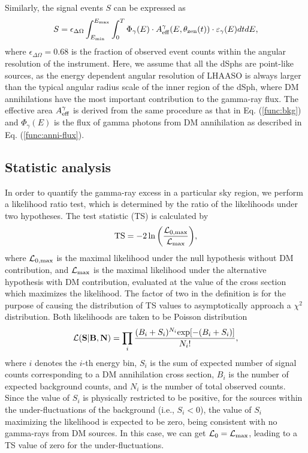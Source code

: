 \documentclass[12pt,aps,prd,amsmath,amssymb,showpacs,floats,floatfix,nofootinbib]{revtex4-1}
\begin{document}
Similarly, the signal events $S$ can be expressed as
\begin{equation}\label{func:sig}
  S=\epsilon_{\Delta\Omega}\int^{E_{\rm max}}_{E_{\rm min}}\int_0^T\Phi_{\gamma}(E)\cdot A_{\rm eff}^{\gamma}(E,\theta_{\rm zen}(t))\cdot\varepsilon_{\gamma}(E)dtdE,
\end{equation}
where $\epsilon_{\Delta\Omega}=0.68$ is the fraction of observed event counts within the angular resolution of the instrument.
Here, we assume that all the dSphs are point-like sources, as the energy dependent angular resolution of LHAASO is always larger than the typical angular radius scale of the inner region of the dSph, where DM annihilations have the most important contribution to the gamma-ray flux.
The effective area $A_{\rm eff}^{\gamma}$ is derived from the same procedure as that in Eq. (\ref{func:bkg}) and $\Phi_{\gamma}(E)$ is the flux of gamma photons from DM annihilation as described in Eq. (\ref{func:anni-flux}).

\subsection{Statistic analysis}\label{sec:analysis}
In order to quantify the gamma-ray excess in a particular sky region, we perform a likelihood ratio test, which is determined by the ratio of the likelihoods under two hypotheses. The test statistic (TS) is calculated by
\begin{equation}\label{func:ts}
  \rm TS=-2\ln\bigg(\frac{\mathcal{L}_{0,{\rm max}}}{\mathcal{L}_{\rm max}}\bigg),
\end{equation}
where $\mathcal{L}_{0,{\rm max}}$ is the maximal likelihood under the null hypothesis without DM contribution, and $\mathcal{L}_{\rm max}$ is the maximal likelihood under the alternative hypothesis with DM contribution, evaluated at the value of the cross section which maximizes the likelihood. The factor of two in the definition is for the purpose of causing the distribution of TS values to asymptotically approach a $\chi^{2}$ distribution. Both likelihoods are taken to be Poisson distribution
\begin{equation}\label{func:likelihood-l}
  \mathcal{L}(\textbf{S}|\textbf{B},\textbf{N})=\prod_{i}\frac{(B_{i}+S_{i})^{N_{i}} {\rm{exp}} [-(B_{i}+S_{i})]}{N_{i}!},
\end{equation}
where $i$ denotes the $i$-th energy bin, $S_{i}$ is the sum of expected number of signal counts corresponding to a DM annihilation cross section, $B_{i}$ is the number of expected background counts, and $N_{i}$ is the number of total observed counts.
Since the value of $S_{i}$ is physically restricted to be positive, for the sources within the under-fluctuations of the background (i.e., $S_{i}<0$), the value of $S_{i}$ maximizing the likelihood is expected to be zero, being consistent with no gamma-rays from DM sources. In this case, we can get $\mathcal{L}_{0}=\mathcal{L}_{\rm max}$, leading to a TS value of zero for the under-fluctuations.
\end{document}
